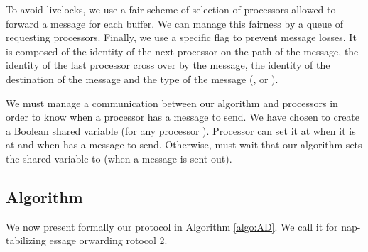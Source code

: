 \documentclass[11pt]{article}
\begin{document}
To avoid livelocks, we use a fair scheme of selection of processors allowed to forward a message for each buffer. We can manage this fairness by a queue of requesting processors. Finally, we use a specific flag to prevent message losses. It is composed of the identity of the next processor on the path of the message, the identity of the last processor cross over by the message, the identity of the destination of the message and the type of the message (,  or ).

We must manage a communication between our algorithm and processors in order to know when a processor has a message to send. We have chosen to create a Boolean shared variable  (for any processor ). Processor  can set it at  when it is at  and when  has a message to send. Otherwise,  must wait that our algorithm sets the shared variable to  (when a message is sent out).

\subsection{Algorithm}

We now present formally our protocol in Algorithm \ref{algo:AD}. We call it \AD for nap-tabilizing essage orwarding rotocol 2.
\end{document}
